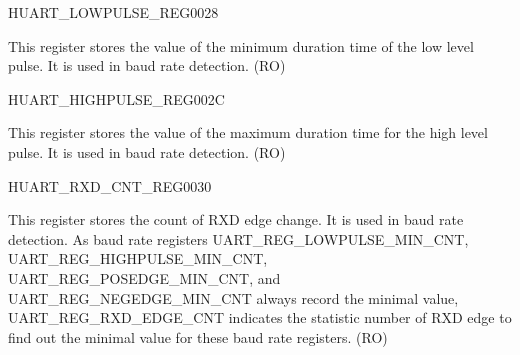 \begin{register}{H}{UART\_LOWPULSE\_REG}{\hexprefix{}0028}\label{regdesc:UARTLOWPULSEREG}
%
%
\regnewline%
\begin{regdesc}\begin{reglist}
\label{fielddesc:UARTLOWPULSEMINCNT}\item [UART\_LOWPULSE\_MIN\_CNT] This register stores the value of the minimum duration time of the low level pulse. It is used in baud rate detection. (RO)
\end{reglist}\end{regdesc}
\end{register}


\begin{register}{H}{UART\_HIGHPULSE\_REG}{\hexprefix{}002C}\label{regdesc:UARTHIGHPULSEREG}
%
%
\regnewline%
\begin{regdesc}\begin{reglist}
\label{fielddesc:UARTHIGHPULSEMINCNT}\item [UART\_HIGHPULSE\_MIN\_CNT] This register stores  the value of the maximum duration time for the high level pulse. It is used in baud rate detection. (RO)
\end{reglist}\end{regdesc}
\end{register}


\begin{register}{H}{UART\_RXD\_CNT\_REG}{\hexprefix{}0030}\label{regdesc:UARTRXDCNTREG}
%
%
\regnewline%
\begin{regdesc}\begin{reglist}
\label{fielddesc:UARTRXDEDGECNT}\item [UART\_RXD\_EDGE\_CNT] This register stores the count of RXD edge change. It is used in baud rate detection. As baud rate registers UART\_REG\_LOWPULSE\_MIN\_CNT, UART\_REG\_HIGHPULSE\_MIN\_CNT, UART\_REG\_POSEDGE\_MIN\_CNT, and UART\_REG\_NEGEDGE\_MIN\_CNT always record the minimal value, UART\_REG\_RXD\_EDGE\_CNT indicates the statistic number of RXD edge to find out the minimal value for these baud rate registers. (RO)
\end{reglist}\end{regdesc}
\end{register}



